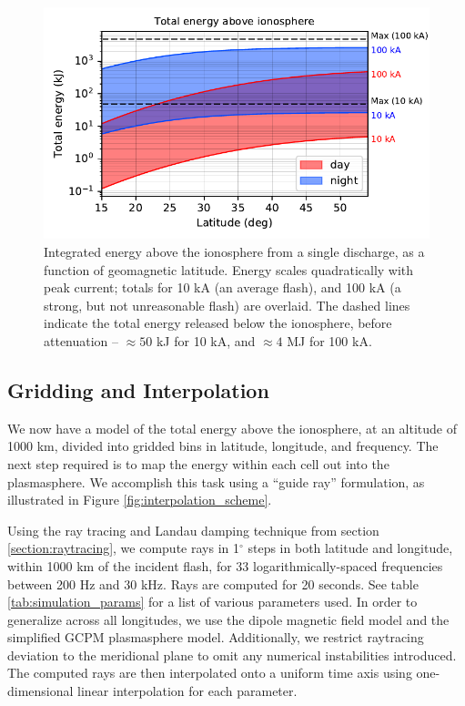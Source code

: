 \begin{figure}[h!]
\begin{center}
\includegraphics{figures/total_energy.pdf}
\caption[Energy above the ionosphere due to a single flash]{Integrated energy above the ionosphere from a single discharge, as a function of geomagnetic latitude. Energy scales quadratically with peak current; totals for 10 kA (an average flash), and 100 kA (a strong, but not unreasonable flash) are overlaid. The dashed lines indicate the total energy released below the ionosphere, before attenuation -- $\approx 50$ kJ for 10 kA, and $\approx 4$ MJ for 100 kA.}
\label{fig:illumination_totals}
\end{center}
\end{figure}


\subsection{Gridding and Interpolation}

We now have a model of the total energy above the ionosphere, at an altitude of 1000 km, divided into gridded bins in latitude, longitude, and frequency. The next step required is to map the energy within each cell out into the plasmasphere. We accomplish this task using a ``guide ray'' formulation, as illustrated in Figure \ref{fig:interpolation_scheme}.

Using the ray tracing and Landau damping technique from section \ref{section:raytracing}, we compute rays in 1$^\circ$ steps in both latitude and longitude, within 1000 km of the incident flash, for 33 logarithmically-spaced frequencies between 200 Hz and 30 kHz. Rays are computed for 20 seconds. See table \ref{tab:simulation_params} for a list of various parameters used. In order to generalize across all longitudes, we use the dipole magnetic field model and the simplified GCPM plasmasphere model. Additionally, we restrict raytracing deviation to the meridional plane to omit any numerical instabilities introduced. The computed rays are then interpolated onto a uniform time axis using one-dimensional linear interpolation for each parameter. 

